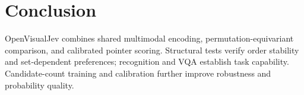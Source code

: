 \section{Conclusion}
OpenVisualJev combines shared multimodal encoding, permutation-equivariant comparison, and calibrated pointer scoring. Structural tests verify order stability and set-dependent preferences; recognition and VQA establish task capability. Candidate-count training and calibration further improve robustness and probability quality.

